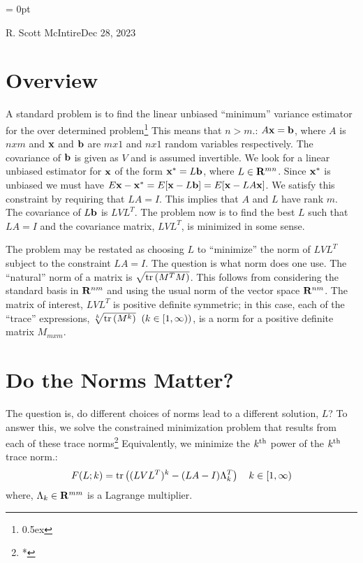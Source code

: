 

\parindent = 0pt

{R. Scott McIntire}{Dec 28, 2023}

\parskip=8pt


\section{Overview}
A standard problem is to find the linear unbiased ``minimum'' variance estimator
for the over determined problem\footnote{\kern 0.5pt \raise 0.5ex \hbox{\dag}}
{This means that $n > m$.}: $A {\bf x} = {\bf b}$, where 
$A$ is $nxm$ and ${\bf x}$ and
${\bf b}$ are $mx1$ and $nx1$ random variables respectively. The
covariance of ${\bf b}$ is given as $V$ and is assumed invertible. 
We look for a linear unbiased estimator for ${\bf x}$ of the form 
${\bf x}^* = L {\bf b}$, where $L\in {\bf R}^{mn}$. Since ${\bf x}^*$
is unbiased we must have 
$E{{\bf x} - {\bf x}^*} = E[{\bf x} - L
  {\bf b}] = E[{\bf x} - LA{\bf x}]$. We satisfy this constraint by
requiring that $LA = I$. This implies that $A$ and $L$ have rank $m$.
The covariance of $L{\bf b}$ is $LVL^T$. The problem now is to find
the best $L$ such that $LA = I$ and the covariance matrix, $LVL^T$, is
minimized in some sense.

The problem may be restated as choosing $L$ to ``minimize'' the norm of $LVL^T$
subject to the constraint $LA = I$. The question is what norm does one
use. The ``natural'' norm of a matrix is $\sqrt{{\rm
    tr}\left(M^TM\right)}$. This 
    follows from considering the standard basis in ${\bf R}^{nm}$ and
    using the usual norm of the vector space ${\bf R}^{nm}$. 
The matrix of interest, $LVL^T$ is positive definite
    symmetric; in this case, each of the ``trace'' 
expressions, $\root k \of {{\rm
          tr}\left(M^k\right)} \;\; (k \in [1,\infty ))$, is a norm for a 
positive definite matrix $M_{mxm}$.

\section{Do the Norms Matter?}
The question is, do different choices of norms lead to a different
solution, $L$? To answer this, we solve the constrained minimization 
problem that results from each of these trace norms\footnote{\kern 0.5pt *}
{Equivalently, we minimize the $k^{\rm th}$ power
of the $k^{\rm th}$ trace norm.}:
$$
F(L; k) = {\rm tr}\left((LVL^T)^k - (LA - I)\Lambda_{k}^T\right) 
\quad k \in [1,\infty)
$$
where, $\Lambda_k \in {\bf R}^{mm}$ is a Lagrange multiplier.

